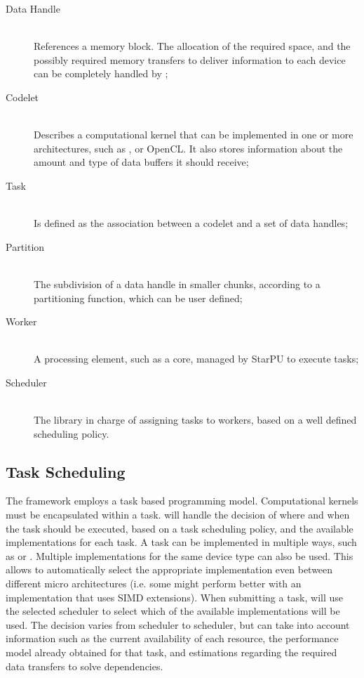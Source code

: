\documentclass[main.tex]{subfiles}
\begin{document}
\begin{description}
  \item[Data Handle] \hfill \\
    References a memory block. The allocation of the required space, and the possibly required memory transfers to deliver information to each device can be completely handled by \starpu;

  \item[Codelet] \hfill \\
    Describes a computational kernel that can be implemented in one or more architectures, such as \cpus, \cuda or \acs{OpenCL}. It also stores information about the amount and type of data buffers it should receive;

  \item[Task] \hfill \\
    Is defined as the association between a codelet and a set of data handles;

  \item[Partition] \hfill \\
    The subdivision of a data handle in smaller chunks, according to a partitioning function, which can be user defined;

  \item[Worker] \hfill \\
    A processing element, such as a \cpu core, managed by StarPU to execute tasks;

  \item[Scheduler] \hfill \\
    The library in charge of assigning tasks to workers, based on a well defined scheduling policy.

\end{description}

\subsection{Task Scheduling}

The framework employs a task based programming model. Computational kernels must be encapsulated within a task. \starpu will handle the decision of where and when the task should be executed, based on a task scheduling policy, and the available implementations for each task. A task can be implemented in multiple ways, such as \cpu or \cuda. Multiple implementations for the same device type can also be used. This allows \starpu to automatically select the appropriate implementation even between different \cpu micro architectures (i.e. some \cpus might perform better with an implementation that uses \acs{SIMD} extensions).
When submitting a task, \starpu will use the selected scheduler to select which of the available implementations will be used. The decision varies from scheduler to scheduler, but can take into account information such as the current availability of each resource, the performance model already obtained for that task, and estimations regarding the required data transfers to solve dependencies.
\end{document}
